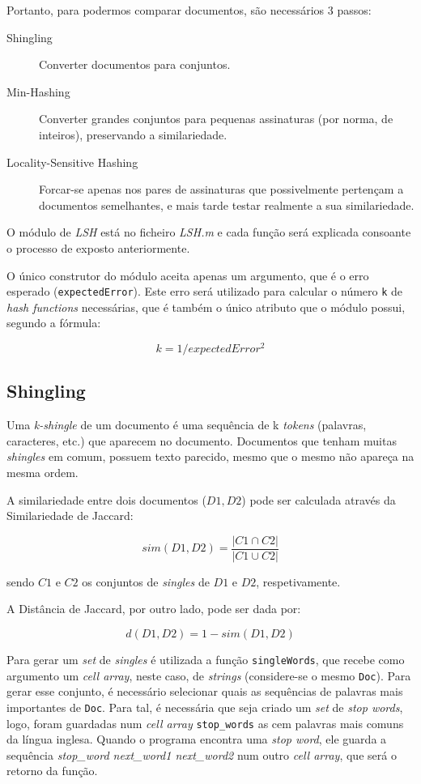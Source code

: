 \documentclass[a4paper,11pt,openright,oneside]{report}
\begin{document}
Portanto, para podermos comparar documentos, são necessários 3 passos:

\begin{description}
\item[Shingling]
Converter documentos para conjuntos.
\item[Min-Hashing]
Converter grandes conjuntos para pequenas assinaturas (por norma, de inteiros), preservando a similariedade.
\item[Locality-Sensitive Hashing]
Forcar-se apenas nos pares de assinaturas que possivelmente pertençam a documentos semelhantes, e mais tarde testar realmente a sua similariedade.
\end{description}

O módulo de \textit{LSH} está no ficheiro \textit{LSH.m} e cada função será explicada consoante o processo de exposto anteriormente.

O único construtor do módulo aceita apenas um argumento, que é o erro esperado (\texttt{expectedError}). Este erro será utilizado para calcular o número \texttt{k} de \textit{hash functions} necessárias, que é também o único atributo que o módulo possui, segundo a fórmula:

$$ k = 1 / expectedError^2 $$

\subsection{Shingling}
\label{subsec.shingling}

Uma \textit{k-shingle} de um documento é uma sequência de k \textit{tokens} (palavras, caracteres, etc.) que aparecem no documento. Documentos que tenham muitas \textit{shingles} em comum, possuem texto parecido, mesmo que o mesmo não apareça na mesma ordem.

A similariedade entre dois documentos ($D1, D2$) pode ser calculada através da Similariedade de Jaccard:

$$ sim(D1, D2) = \frac{|C1\cap C2|}{|C1\cup C2|} $$

sendo $C1$ e $C2$ os conjuntos de \textit{singles} de $D1$ e $D2$, respetivamente.

A Distância de Jaccard, por outro lado, pode ser dada por:

$$ d(D1, D2) = 1 - sim(D1, D2) $$

Para gerar um \textit{set} de \textit{singles} é utilizada a função \texttt{singleWords}, que recebe como argumento um \textit{cell array}, neste caso, de \textit{strings} (considere-se o mesmo \texttt{Doc}). Para gerar esse conjunto, é necessário selecionar quais as sequências de palavras mais importantes de \texttt{Doc}. Para tal, é necessária que seja criado um \textit{set} de \textit{stop words}, logo, foram guardadas num \textit{cell array} \texttt{stop_words} as cem palavras mais comuns da língua inglesa. Quando o programa encontra uma \textit{stop word}, ele guarda a sequência \textit{stop\_word next\_word1 next\_word2} num outro \textit{cell array}, que será o retorno da função.
\end{document}
